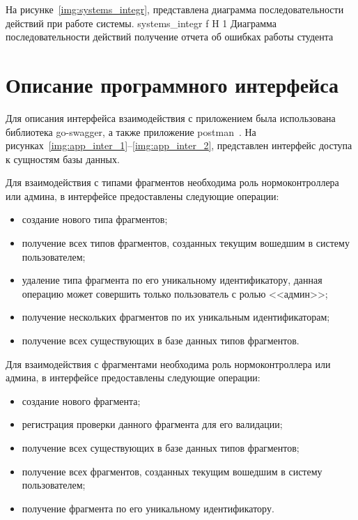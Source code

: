 На рисунке~\ref{img:systems_integr}, представлена диаграмма последовательности
действий при работе системы.
{systems_integr} %
{f} %
{H} %
{1\textwidth} %
{Диаграмма последовательности действий получение отчета об ошибках работы
	студента} %






\section{Описание программного интерфейса}
Для описания интерфейса взаимодействия с приложением была использована
библиотека go-swagger, а также приложение postman~\cite{go-swagger,postman}. На
рисунках~\ref{img:app_inter_1}--\ref{img:app_inter_2}, представлен интерфейс
доступа к сущностям базы данных.

Для взаимодействия с типами фрагментов необходима роль нормоконтроллера или
админа, в интерфейсе предоставлены следующие операции:
\begin{itemize}
	\item создание нового типа фрагментов;
	\item получение всех типов фрагментов, созданных текущим вошедшим в систему
	пользователем;
	\item удаление типа фрагмента по его уникальному идентификатору, данная
	операцию может совершить только пользователь с ролью <<админ>>;
	\item получение нескольких фрагментов по их уникальным идентификаторам;
	\item получение всех существующих в базе данных типов фрагментов.
\end{itemize}

Для взаимодействия с фрагментами необходима роль нормоконтроллера или админа, в
интерфейсе предоставлены следующие операции:
\begin{itemize}
	\item создание нового фрагмента;
	\item регистрация проверки данного фрагмента для его валидации;
	\item получение всех существующих в базе данных типов фрагментов;
	\item получение всех фрагментов, созданных текущим вошедшим в систему
	пользователем;
	\item получение фрагмента по его уникальному идентификатору.
\end{itemize}

